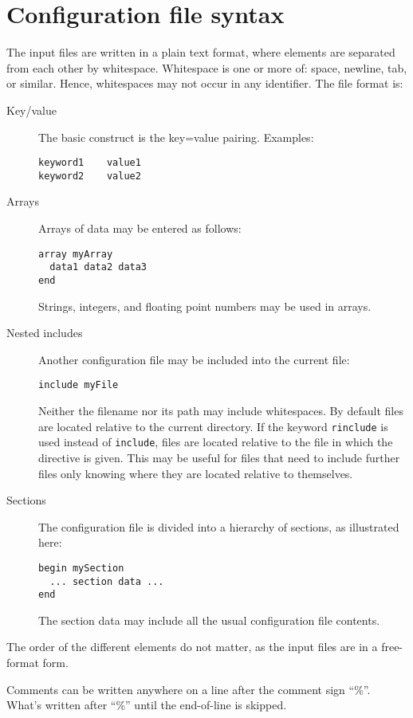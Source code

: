 \chapter{Configuration file syntax}

The input files are written in a plain text format, where elements are
separated from each other by whitespace. Whitespace is one or more of:
space, newline, tab, or similar. Hence, whitespaces may not occur in
any identifier.  The file format is:
\begin{description}
\item[Key/value] The basic construct is the key=value pairing. Examples:
\begin{verbatim}
keyword1	value1
keyword2	value2
\end{verbatim}
\item[Arrays] Arrays of data may be entered as follows:
\begin{verbatim}
array myArray
  data1 data2 data3
end
\end{verbatim}
  Strings, integers, and floating point numbers may be used in arrays.

\item[Nested includes] Another configuration file may be included into
the current file:
\begin{verbatim}
include myFile
\end{verbatim}
Neither the filename nor its path may include whitespaces. By default
files are located relative to the current directory. If the keyword 
{\tt rinclude} is used instead of {\tt include}, files are located relative
to the file in which the directive is given. This may be useful for
files that need to include further files only knowing where they are
located relative to themselves.
\item[Sections] The configuration file is divided into a hierarchy of sections,
as illustrated here:
\begin{verbatim}
begin mySection
  ... section data ...
end
\end{verbatim}
The section data may include all the usual configuration file contents.
\end{description}

The order of the different elements do not matter, as the input files
are in a free-format form.

Comments can be written anywhere on a line after the comment sign
``\%''. What's written after ``\%'' until the end-of-line is skipped.


